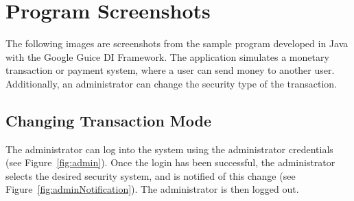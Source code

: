\documentclass[12pt,twocolumn]{IEEEtran}
\begin{document}
\section{Program Screenshots} \label{app:screenshots}
\setcounter{figure}{0}  
\setcounter{equation}{0} 
\setcounter{table}{0}

The following images are screenshots from the sample program developed in Java with the Google Guice DI Framework. The application simulates a monetary transaction or payment system, where a user can send money to another user. Additionally, an administrator can change the security type of the transaction.

\subsection{Changing Transaction Mode}

The administrator can log into the system using the administrator credentials (see Figure~\ref{fig:admin}). Once the login has been successful, the administrator selects the desired security system, and is notified of this change (see Figure~\ref{fig:adminNotification}). The administrator is then logged out.
\end{document}
